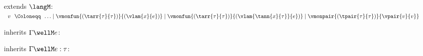 \begin{flushleft}

 extends $\langM$:\\
$\begin{array}{l@{~~}c@{~~}l}
  v & \Coloneqq & \ldots \mid \vmonfun{(\tarr{\tau}{\tau})}{(\vlam{x}{e})} \mid
      \vmonfun{(\tarr{\tau}{\tau})}{(\vlam{\tann{x}{\tau}}{e})} \mid
      \vmonpair{(\tpair{\tau}{\tau})}{\vpair{v}{v}}
\end{array}$

\bigskip
\begin{minipage}[t]{\columnwidth}
 inherits $\Gamma \wellM e$:
\begin{mathpar}

\end{mathpar}
\end{minipage}%
\begin{minipage}[t]{\columnwidth}
 inherits $\Gamma \wellM e : \tau$:
\begin{mathpar}

\end{mathpar}
\end{minipage}



\end{flushleft}
